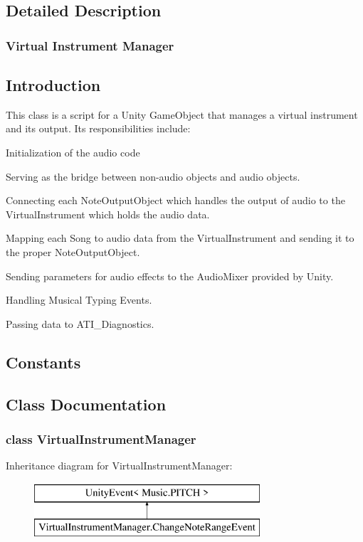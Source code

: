 \subsection{Detailed Description}
\hypertarget{VirtualInstrumentManager}{}\subsubsection{Virtual Instrument Manager}\label{VirtualInstrumentManager}
\hypertarget{group___virtual_instrument_manager_Intro}{}\subsection{Introduction}\label{group___virtual_instrument_manager_Intro}
This class is a script for a Unity Game\+Object that manages a virtual instrument and its output. Its responsibilities include\+: \begin{DoxyItemize}
\item Initialization of the audio code \item Serving as the bridge between non-\/audio objects and audio objects. \item Connecting each Note\+Output\+Object which handles the output of audio to the Virtual\+Instrument which holds the audio data. \item Mapping each Song to audio data from the Virtual\+Instrument and sending it to the proper Note\+Output\+Object. \item Sending parameters for audio effects to the Audio\+Mixer provided by Unity. \item Handling Musical Typing Events. \item Passing data to A\+T\+I\+\_\+\+Diagnostics. \end{DoxyItemize}
\hypertarget{VirtualInstrumentManager.cs_Constants}{}\subsection{Constants}\label{VirtualInstrumentManager.cs_Constants}


\subsection{Class Documentation}
\label{class_virtual_instrument_manager}
\subsubsection{class Virtual\+Instrument\+Manager}
Inheritance diagram for Virtual\+Instrument\+Manager\+:\begin{figure}[H]
\begin{center}
\leavevmode
\includegraphics[height=2.000000cm]{group___virtual_instrument_manager}
\end{center}
\end{figure}
